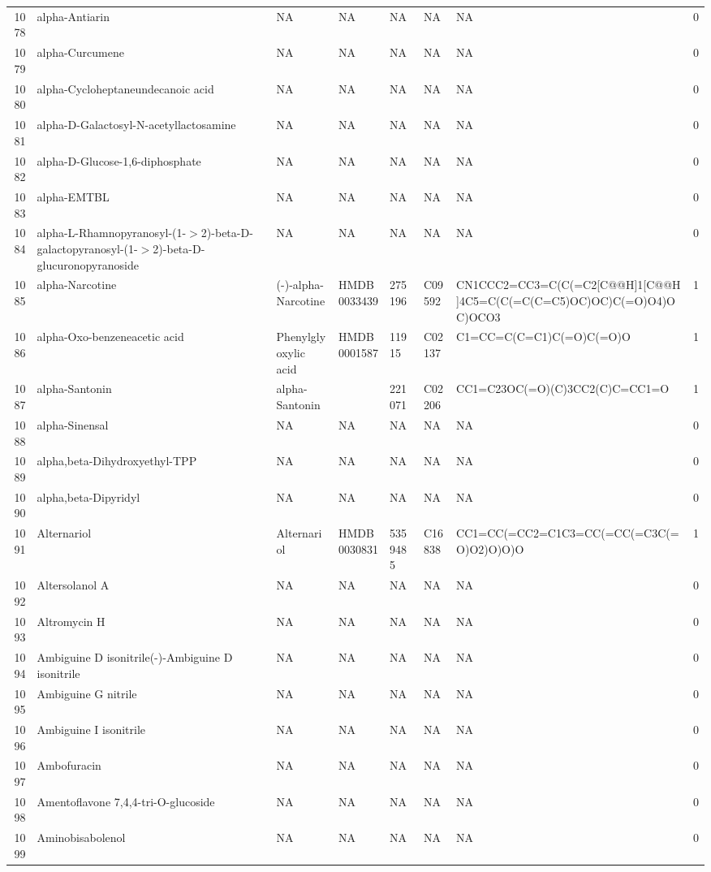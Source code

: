 \documentclass[a4paper]{article}
\begin{document}
\begin{longtable}{rlllllll}
  1078 & alpha-Antiarin & NA & NA & NA & NA & NA & 0 \\ 
  1079 & alpha-Curcumene & NA & NA & NA & NA & NA & 0 \\ 
  1080 & alpha-Cycloheptaneundecanoic acid & NA & NA & NA & NA & NA & 0 \\ 
  1081 & alpha-D-Galactosyl-N-acetyllactosamine & NA & NA & NA & NA & NA & 0 \\ 
  1082 & alpha-D-Glucose-1,6-diphosphate & NA & NA & NA & NA & NA & 0 \\ 
  1083 & alpha-EMTBL & NA & NA & NA & NA & NA & 0 \\ 
  1084 & alpha-L-Rhamnopyranosyl-(1-$>$2)-beta-D-galactopyranosyl-(1-$>$2)-beta-D-glucuronopyranoside & NA & NA & NA & NA & NA & 0 \\ 
  1085 & alpha-Narcotine & (-)-alpha-Narcotine & HMDB0033439 & 275196 & C09592 & CN1CCC2=CC3=C(C(=C2[C@@H]1[C@@H]4C5=C(C(=C(C=C5)OC)OC)C(=O)O4)OC)OCO3 & 1 \\ 
  1086 & alpha-Oxo-benzeneacetic acid & Phenylglyoxylic acid & HMDB0001587 & 11915 & C02137 & C1=CC=C(C=C1)C(=O)C(=O)O & 1 \\ 
  1087 & alpha-Santonin & alpha-Santonin &  & 221071 & C02206 & CC1=C23OC(=O)(C)3CC2(C)C=CC1=O & 1 \\ 
  1088 & alpha-Sinensal & NA & NA & NA & NA & NA & 0 \\ 
  1089 & alpha,beta-Dihydroxyethyl-TPP & NA & NA & NA & NA & NA & 0 \\ 
  1090 & alpha,beta-Dipyridyl & NA & NA & NA & NA & NA & 0 \\ 
  1091 & Alternariol & Alternariol & HMDB0030831 & 5359485 & C16838 & CC1=CC(=CC2=C1C3=CC(=CC(=C3C(=O)O2)O)O)O & 1 \\ 
  1092 & Altersolanol A & NA & NA & NA & NA & NA & 0 \\ 
  1093 & Altromycin H & NA & NA & NA & NA & NA & 0 \\ 
  1094 & Ambiguine D isonitrile(-)-Ambiguine D isonitrile & NA & NA & NA & NA & NA & 0 \\ 
  1095 & Ambiguine G nitrile & NA & NA & NA & NA & NA & 0 \\ 
  1096 & Ambiguine I isonitrile & NA & NA & NA & NA & NA & 0 \\ 
  1097 & Ambofuracin & NA & NA & NA & NA & NA & 0 \\ 
  1098 & Amentoflavone 7,4,4-tri-O-glucoside & NA & NA & NA & NA & NA & 0 \\ 
  1099 & Aminobisabolenol & NA & NA & NA & NA & NA & 0 \\ 

\end{longtable}
\end{document}
